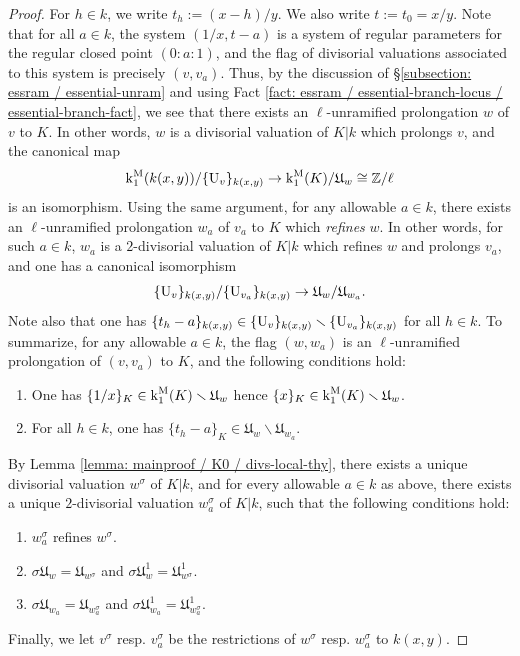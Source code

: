 \documentclass[11pt]{amsart}
\theoremstyle{definition}
\theoremstyle{remark}
\numberwithin{equation}{section}
\newcommand{\Z}{\mathbb{Z}}
\newcommand{\U}{{\rm U}}
\newcommand{\Ufrak}{\mathfrak{U}}
\renewcommand{\k}{\operatorname{k}^{\rm M}}
\begin{document}
\begin{proof}
  For $h \in k$, we write $t_h := (x-h)/y$.
  We also write $t := t_0 = x/y$.
  Note that for all $a \in k$, the system $(1/x,t-a)$ is a system of regular parameters for the regular closed point $(0:a:1)$, and the flag of divisorial valuations associated to this system is precisely $(v,v_a)$.
  Thus, by the discussion of \S\ref{subsection: essram / essential-unram} and using Fact \ref{fact: essram / essential-branch-locus / essential-branch-fact}, we see that there exists an $\ell$-unramified prolongation $w$ of $v$ to $K$.
  In other words, $w$ is a divisorial valuation of $K|k$ which prolongs $v$, and the canonical map
  \[ \k_1(k(x,y))/\{\U_v\}_{k(x,y)} \rightarrow \k_1(K)/\Ufrak_w \cong \Z/\ell \]
  is an isomorphism.
  Using the same argument, for any allowable $a \in k$, there exists an $\ell$-unramified prolongation $w_a$ of $v_a$ to $K$ which \emph{refines} $w$.
  In other words, for such $a \in k$, $w_a$ is a $2$-divisorial valuation of $K|k$ which refines $w$ and prolongs $v_a$, and one has a canonical isomorphism
  \[ \{\U_v\}_{k(x,y)}/\{\U_{v_a}\}_{k(x,y)} \rightarrow \Ufrak_w/\Ufrak_{w_a}. \]
  Note also that one has $\{t_h-a\}_{k(x,y)} \in \{\U_v\}_{k(x,y)}\smallsetminus\{\U_{v_a}\}_{k(x,y)}$ for all $h \in k$.
  To summarize, for any allowable $a \in k$, the flag $(w,w_a)$ is an $\ell$-unramified prolongation of $(v,v_a)$ to $K$, and the following conditions hold:
  \begin{enumerate}
    \item One has $\{1/x\}_K \in \k_1(K) \smallsetminus \Ufrak_w$ hence $\{x\}_K \in \k_1(K) \smallsetminus \Ufrak_w$.
    \item For all $h \in k$, one has $\{t_h-a\}_K \in \Ufrak_w \smallsetminus \Ufrak_{w_a}$.
  \end{enumerate}

  By Lemma \ref{lemma: mainproof / K0 / divs-local-thy}, there exists a unique divisorial valuation $w^\sigma$ of $K|k$, and for every allowable $a \in k$ as above, there exists a unique $2$-divisorial valuation $w_a^\sigma$ of $K|k$, such that the following conditions hold:
  \begin{enumerate}
    \item $w_a^\sigma$ refines $w^\sigma$.
    \item $\sigma\Ufrak_w = \Ufrak_{w^\sigma}$ and $\sigma \Ufrak_w^1 = \Ufrak_{w^\sigma}^1$.
    \item $\sigma\Ufrak_{w_a} = \Ufrak_{w_a^\sigma}$ and $\sigma \Ufrak_{w_a}^1 = \Ufrak_{w_a^\sigma}^1$.
  \end{enumerate}
  Finally, we let $v^\sigma$ resp. $v_a^\sigma$ be the restrictions of $w^\sigma$ resp. $w_a^\sigma$ to $k(x,y)$.


\end{proof}
\end{document}
